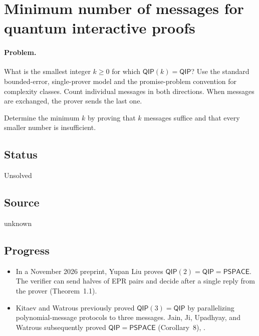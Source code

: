 \section{Minimum number of messages for quantum interactive proofs}
\label{sec:op_bee5499963f5e390}

\paragraph{Problem.}
What is the smallest integer $k\geq 0$ for which $\mathsf{QIP}(k)=\mathsf{QIP}$?
Use the standard bounded-error, single-prover model and the promise-problem convention for complexity classes. Count individual messages in both directions. When messages are exchanged, the prover sends the last one.

Determine the minimum $k$ by proving that $k$ messages suffice and that every smaller number is insufficient.

\subsection*{Status}

Unsolved

\subsection*{Source}

unknown

\subsection*{Progress}

\begin{itemize}
  \item In a November 2026 preprint, Yupan Liu proves $\mathsf{QIP}(2)=\mathsf{QIP}=\mathsf{PSPACE}$. The verifier can send halves of EPR pairs and decide after a single reply from the prover  (Theorem~1.1).

  \item Kitaev and Watrous previously proved $\mathsf{QIP}(3)=\mathsf{QIP}$ by parallelizing polynomial-message protocols to three messages. Jain, Ji, Upadhyay, and Watrous subsequently proved $\mathsf{QIP}=\mathsf{PSPACE}$  (Corollary~8), .
\end{itemize}

